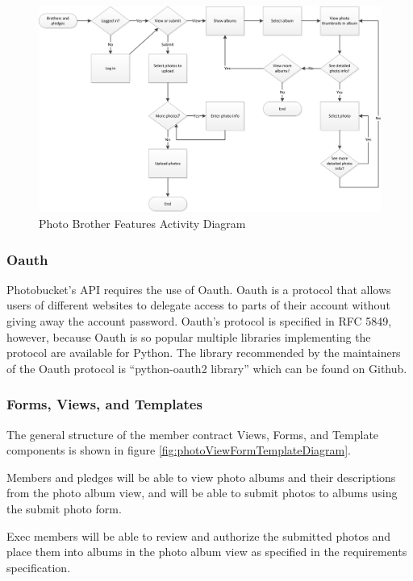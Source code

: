 \documentclass{article}
\begin{document}
\FloatBarrier
\begin{figure}
\centering
\includegraphics[scale=.65]{img/activityDiagrams/photoActivity2}
\caption{Photo Brother Features Activity Diagram}
\label{fig:photoBrotherActivityDiagram}
\end{figure}
\FloatBarrier

\subsubsection{Oauth}

Photobucket's API requires the use of Oauth. Oauth is a protocol that allows users of different websites to delegate access
to parts of their account without giving away the account password. Oauth's protocol is specified in RFC 5849, however, because Oauth is so popular multiple libraries implementing the protocol are available for Python. \cite{eranhueniverse_oauth} The library recommended by the maintainers of the Oauth protocol is ``python-oauth2 library'' which can be found on Github. \cite{oauth_code} \cite{simplego_python-oauth2_2011}

\subsubsection{Forms, Views, and Templates}

The general structure of the member contract Views, Forms, and Template components is shown in figure \ref{fig:photoViewFormTemplateDiagram}.

Members and pledges will be able to view photo albums and their descriptions from the photo album view, and will be able to submit photos to albums using the submit photo form.

Exec members will be able to review and authorize the submitted photos and place them into albums in the photo album view as specified in the requirements specification.
\end{document}
